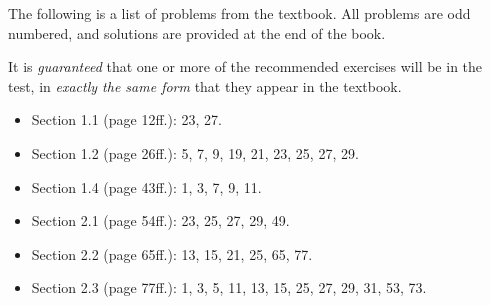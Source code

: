 \documentclass[12pt]{article}
\begin{document}
\sffamily

The following is a list of problems from the textbook. All problems are odd numbered, and solutions are provided at the end of the book.

It is \emph{guaranteed} that one or more of the recommended exercises will be in the test, in \emph{exactly the same form} that they appear in the textbook.

\begin{itemize} 
\item Section 1.1 (page 12ff.): 23, 27.
\item Section 1.2 (page 26ff.): 5, 7, 9, 19, 21, 23, 25, 27, 29. 
\item Section 1.4 (page 43ff.): 1, 3, 7, 9, 11.
\item Section 2.1 (page 54ff.): 23, 25, 27, 29, 49. 
\item Section 2.2 (page 65ff.): 13, 15, 21, 25, 65, 77.
\item Section 2.3 (page 77ff.): 1, 3, 5, 11, 13, 15, 25, 27, 29, 31, 53, 73.
\end{itemize}
\end{document}

